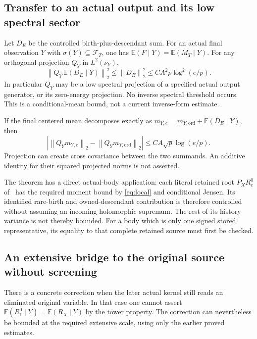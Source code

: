 \documentclass[11pt,letterpaper]{article}
\theoremstyle{remark}\newtheorem{remark}[theorem]{Remark}
\newcommand{\E}{\mathbb E}
\newcommand{\norm}[1]{\left\lVert#1\right\rVert}
\newcommand{\cF}{\mathcal F}
\begin{document}
\subsection{Transfer to an actual output and its low spectral sector}

Let \(D_E\) be the controlled birth-plus-descendant sum. For an actual final observation \(Y\) with \(\sigma(Y)\subseteq\cF_T\), one has \(\E(F\mid Y)=\E(M_T\mid Y)\). For any orthogonal projection \(Q_Y\) in \(L^2(\nu_Y)\),
\begin{equation}\label{eq:project}
 \boxed{\quad
 \norm{Q_Y\,\E(D_E\mid Y)}_2^2
 \le \norm{D_E}_2^2
 \le CA^2p\log^2(e/p).
 \quad}
\end{equation}
In particular \(Q_Y\) may be a low spectral projection of a specified actual output generator, or its zero-energy projection. No inverse spectral threshold occurs. This is a conditional-mean bound, not a current inverse-form estimate.

If the final centered mean decomposes exactly as
\(m_{Y,c}=m_{Y,\mathrm{ord}}+\E(D_E\mid Y)\), then
\[
 \left|\norm{Q_Ym_{Y,c}}_2-\norm{Q_Ym_{Y,\mathrm{ord}}}_2\right|
 \le CA\sqrt p\log(e/p).
\]
Projection can create cross covariance between the two summands. An additive identity for their squared projected norms is not asserted.

The theorem has a direct actual-body application: each literal retained root \(P_XR_e^0\) of~\cite[\S\S3--5]{SZ} has the required moment bound by \eqref{eq:local} and conditional Jensen. Its identified rare-birth and owned-descendant contribution is therefore controlled without assuming an incoming holomorphic supremum. The rest of its history variance is not thereby bounded. For a body which is only one signed stored representative, its equality to that complete retained source must first be checked.

\subsection{An extensive bridge to the original source without screening}

There is a concrete correction when the later actual kernel still reads an eliminated original variable. In that case one cannot assert
\(\E(R_1^0\mid Y)=\E(R_X\mid Y)\) by the tower property. The correction can nevertheless be bounded at the required extensive scale, using only the earlier proved estimates.
\end{document}
